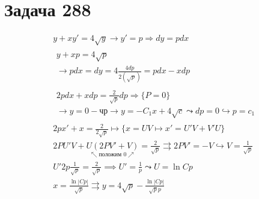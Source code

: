 \section{Задача 288}

\begin{gather}
  y+xy'=4\sqrt{y}\longrightarrow y'=p\Rightarrow dy=pdx\\
  \begin{split}
    y+xp=4\sqrt{p} \\
    \longrightarrow pdx=dy=4\frac{4dp}{2(\sqrt{p})}=pdx-xdp
  \end{split} \\
  \begin{split}
    2pdx+xdp=\frac{2}{\sqrt{p}}dp\Longrightarrow \{P=0\} \\ 
    \rightarrow \boxed{y=0-\text{чр}}\rightarrow\boxed{y=-C_1x+4\sqrt{c}}\leadsto dp=0
    \hookrightarrow p=c_1 
  \end{split}\\
2px'+x=\frac{2}{2\sqrt{p}}\longmapsto\{x=UV\mapsto x'=U'V+V'U\}\\
2PU'V+\underset{\nwarrow \text{положим }0\nearrow }{U(2PV'+V)}=\frac{2}{\sqrt{p}}\rightrightarrows 2PV'=-V\hookrightarrow 
\boxed{V=\frac{1}{\sqrt{p}}}\\
U'2p\frac{1}{\sqrt{p}}=\frac{2}{\sqrt{p}}\implies U'=\frac{1}{p}\leadsto \boxed{U=\ln {Cp}}\\
x=\frac{\ln|Cp|}{\sqrt{p}}\rightrightarrows \boxed{ y=4\sqrt{p}-\frac{\ln |Cp|}{\sqrt{p}p}} 
\end{gather}

